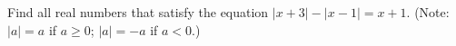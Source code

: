 Find all real numbers that satisfy the equation $|x+3|-|x-1|=x+1$. (Note: $|a| = a$ if $a\ge 0$; $|a|=-a$ if $a<0$.)